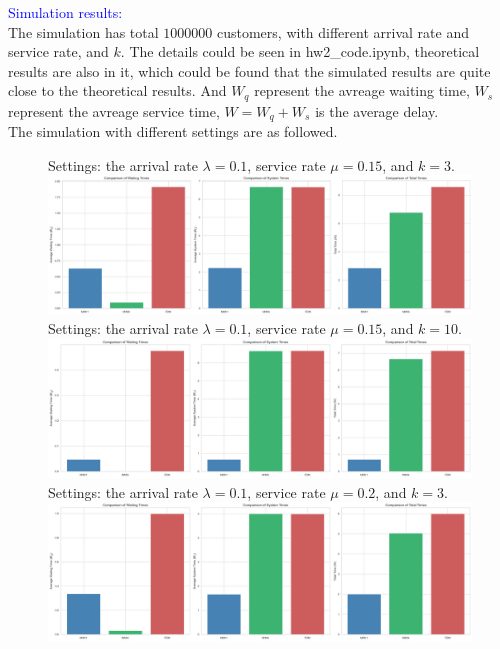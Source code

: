 \begin{homeworkProblem}
\textcolor{blue}{Simulation results:} \\
The simulation has total $1000000$ customers, with different arrival rate and service rate, and $k$. The details could be seen in hw2\_code.ipynb, theoretical results are also in it, which could be found that the simulated results are quite close to the theoretical results. And $W_q$ represent the avreage waiting time, $W_s$ represent the avreage service time, $W=W_q+W_s$ is the average delay. \\
The simulation with different settings are as followed.
\begin{figure}[h]
    \centering
    Settings: the arrival rate $\lambda = 0.1$, service rate $\mu = 0.15$, and $k=3$.
    \includegraphics[width=\textwidth]{./figure/scenario1.png}
    Settings: the arrival rate $\lambda = 0.1$, service rate $\mu = 0.15$, and $k=10$.
    \includegraphics[width=\textwidth]{./figure/scenario2.png}
    Settings: the arrival rate $\lambda = 0.1$, service rate $\mu = 0.2$, and $k=3$.
    \includegraphics[width=\textwidth]{./figure/scenario3.png}
\end{figure}
\vspace{0.5in}
\begin{figure}[h]

\end{figure}
\end{homeworkProblem}
